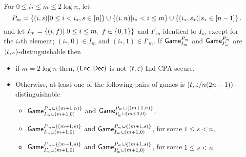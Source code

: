 \documentclass{article}
\def\A{{\sf A}}
\newcommand{\game}{{\sf Game}}
\newcommand{\dgg}[2]{\game_{#1}^{#2}}
\begin{document}

\begin{lemma}\label{lem:multiple}
For $0\leq i_*\leq m \leq 2\log n$, let  $$P_m=\left\{ (i,s)| 0\leq i < i_*, s\in [n] \right\}\cup \left\{ (i,n)| i_*< i \leq m \right\} \cup \left\{ (i_*,s_*)| s_*\in[n-1] \right\}.$$ and let $I_m=\left\{ (i,f)| \ 0\leq i \leq m,\ f\in\{0,1\} \right\}$ and $I'_m$ identical to $I_m$ except for the $i_*$th element; $(i_*,0)\in I_m$ and $(i_*,1) \in I'_m$. If $\dgg{I_m}{P_m}$ and $\dgg{I'_m}{P_m}$ are $(t,\varepsilon)$-distinguishable then

\begin{itemize}
\item if $m=2\log n$ then, $({\sf Enc},{\sf Dec})$ is not $(t, \varepsilon)$-Ind-CPA-secure.
\item Otherwise, 
 at least one of the following pairs of games is $(t,\varepsilon/n(2n-1))$-distinguishable

\begin{itemize}
\item $\dgg{I_m\cup (m+1,0)}{P_m\cup \cub{(m+1, n)}}$ and $\dgg{I'_m\cup (m+1,0)}{P_m\cup \cub{(m+1, n)}}$,
\item $\dgg{I_m\cup (m+1,0)}{P_m\cup \cub{(m+1, s)}}$ and $\dgg{I_m\cup (m+1,0)}{P_m\cup \cub{(m+1, s)}}$, for some  $1\leq s< n$,
\item $\dgg{I'_m\cup (m+1,0)}{P_m\cup \cub{(m+1, s)}}$ and $\dgg{I'_m\cup (m+1,0)}{P_m\cup \cub{(m+1, s)}}$, for some  $1\leq s < n$
\end{itemize}
 \end{itemize}
\end{lemma}
\end{document}
